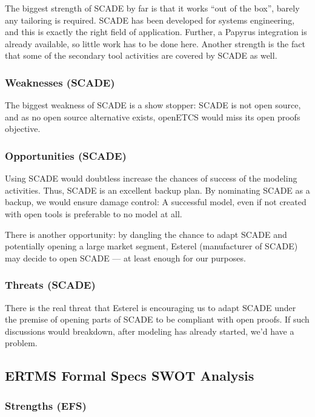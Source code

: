 The biggest strength of SCADE by far is that it works ``out of the box'', barely any tailoring is required.  SCADE has been developed for systems engineering, and this is exactly the right field of application.  Further, a Papyrus integration is already available, so little work has to be done here.  Another strength is the fact that some of the secondary tool activities are covered by SCADE as well.

\subsubsection{Weaknesses (SCADE)}

The biggest weakness of SCADE is a show stopper: SCADE is not open source, and as no open source alternative exists, openETCS would miss its open proofs objective.

\subsubsection{Opportunities (SCADE)}

Using SCADE would doubtless increase the chances of success of the modeling activities.  Thus, SCADE is an excellent backup plan.  By nominating SCADE as a backup, we would ensure damage control: A successful model, even if not created with open tools is preferable to no model at all.

There is another opportunity: by dangling the chance to adapt SCADE and potentially opening a large market segment, Esterel (manufacturer of SCADE) may decide to open SCADE --- at least enough for our purposes.

\subsubsection{Threats (SCADE)}

There is the real threat that Esterel is encouraging us to adapt SCADE under the premise of opening parts of SCADE to be compliant with open proofs.  If such discussions would breakdown, after modeling has already started, we'd have a problem.

\subsection{ERTMS Formal Specs SWOT Analysis}

\subsubsection{Strengths (EFS)}

